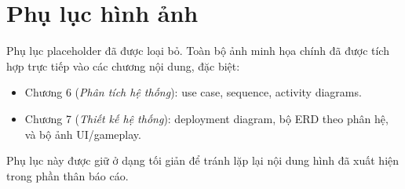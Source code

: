 \appendix
\section{Phụ lục hình ảnh}
\label{appendix:images}

Phụ lục placeholder đã được loại bỏ. Toàn bộ ảnh minh họa chính đã được tích hợp trực tiếp vào các chương nội dung, đặc biệt:
\begin{itemize}
    \item Chương 6 (\textit{Phân tích hệ thống}): use case, sequence, activity diagrams.
    \item Chương 7 (\textit{Thiết kế hệ thống}): deployment diagram, bộ ERD theo phân hệ, và bộ ảnh UI/\allowbreak gameplay.
\end{itemize}

Phụ lục này được giữ ở dạng tối giản để tránh lặp lại nội dung hình đã xuất hiện trong phần thân báo cáo.

